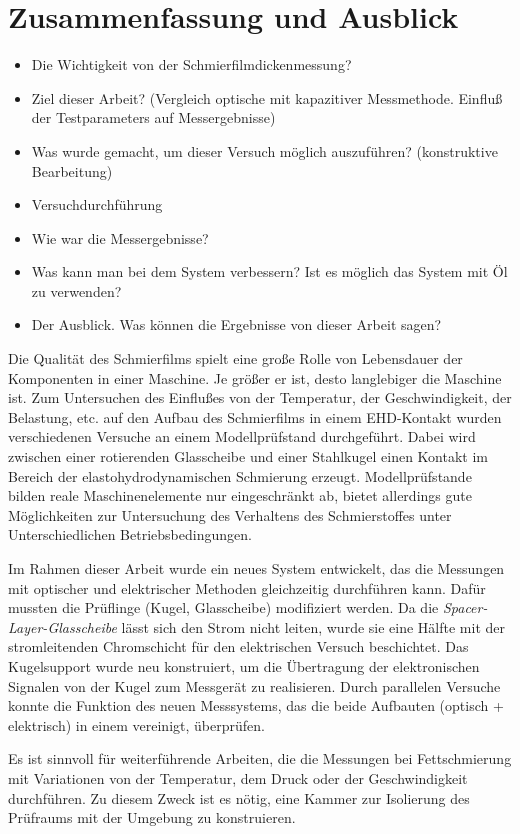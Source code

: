\chapter{Zusammenfassung und Ausblick}
\label{zusammenfassung_und_ausblick}

\begin{itemize}
    \item Die Wichtigkeit von der Schmierfilmdickenmessung?
    \item Ziel dieser Arbeit? (Vergleich optische mit kapazitiver Messmethode. Einfluß der Testparameters auf Messergebnisse)
    \item Was wurde gemacht, um dieser Versuch möglich auszuführen? (konstruktive Bearbeitung)
    \item Versuchdurchführung
    \item Wie war die Messergebnisse?
    \item Was kann man bei dem System verbessern? Ist es möglich das System mit Öl zu verwenden?
    \item Der Ausblick. Was können die Ergebnisse von dieser Arbeit sagen?
\end{itemize}

Die Qualität des Schmierfilms spielt eine große Rolle von Lebensdauer der Komponenten in einer Maschine.
Je größer er ist, desto langlebiger die Maschine ist.  
Zum Untersuchen des Einflußes von der Temperatur, der Geschwindigkeit, der Belastung, etc. auf den Aufbau des Schmierfilms in einem EHD-Kontakt wurden verschiedenen Versuche an einem Modellprüfstand durchgeführt.
Dabei wird zwischen einer rotierenden Glasscheibe und einer Stahlkugel einen Kontakt im Bereich der elastohydrodynamischen Schmierung erzeugt.
Modellprüfstande bilden reale Maschinenelemente nur eingeschränkt ab, bietet allerdings gute Möglichkeiten zur Untersuchung des Verhaltens des Schmierstoffes unter Unterschiedlichen Betriebsbedingungen.

Im Rahmen dieser Arbeit wurde ein neues System entwickelt, das die Messungen mit optischer und elektrischer Methoden gleichzeitig durchführen kann.
Dafür mussten die Prüflinge (Kugel, Glasscheibe) modifiziert werden.
Da die \textit{Spacer-Layer-Glasscheibe} lässt sich den Strom nicht leiten, wurde sie eine Hälfte mit der stromleitenden Chromschicht für den elektrischen Versuch beschichtet.
Das Kugelsupport wurde neu konstruiert, um die Übertragung der elektronischen Signalen von der Kugel zum Messgerät zu realisieren.
Durch parallelen Versuche konnte die Funktion des neuen Messsystems, das die beide Aufbauten (optisch + elektrisch) in einem vereinigt, überprüfen.


Es ist sinnvoll für weiterführende Arbeiten, die die Messungen bei Fettschmierung mit Variationen von der Temperatur, dem Druck oder der Geschwindigkeit durchführen.
Zu diesem Zweck ist es nötig, eine Kammer zur Isolierung des Prüfraums mit der Umgebung zu konstruieren.

